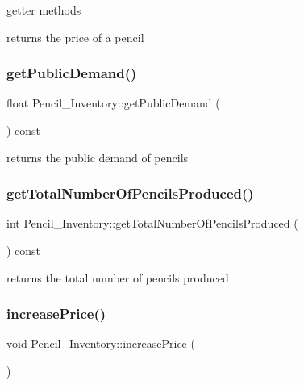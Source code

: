 getter methods 

returns the price of a pencil \mbox{\label{classPencil__Inventory_ac9bab24db01e4515abe06a3c5ec48fcf}} 
\subsubsection{\texorpdfstring{getPublicDemand()}{getPublicDemand()}}
{\footnotesize\ttfamily float Pencil\+\_\+\+Inventory\+::get\+Public\+Demand (\begin{DoxyParamCaption}{ }\end{DoxyParamCaption}) const}



returns the public demand of pencils 

\mbox{\label{classPencil__Inventory_ad7efa852dea32675f689e36c0ddfd7a7}} 
\subsubsection{\texorpdfstring{getTotalNumberOfPencilsProduced()}{getTotalNumberOfPencilsProduced()}}
{\footnotesize\ttfamily int Pencil\+\_\+\+Inventory\+::get\+Total\+Number\+Of\+Pencils\+Produced (\begin{DoxyParamCaption}{ }\end{DoxyParamCaption}) const}



returns the total number of pencils produced 

\mbox{\label{classPencil__Inventory_a7c9e758743530d09b95cd691181d078f}} 
\subsubsection{\texorpdfstring{increasePrice()}{increasePrice()}}
{\footnotesize\ttfamily void Pencil\+\_\+\+Inventory\+::increase\+Price (\begin{DoxyParamCaption}{ }\end{DoxyParamCaption})}



